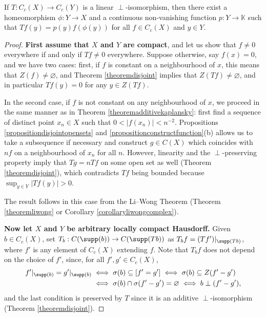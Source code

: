 
\begin{theorem}\label{theoremjarosz}
If $T:C_c(X)\to C_c(Y)$ is a linear $\perp$-isomorphism, then there exist a homeomorphism $\phi:Y\to X$ and a continuous non-vanishing function $p:Y\to\mathbb{K}$ such that $Tf(y)=p(y)f(\phi(y))$ for all $f\in C_c(X)$ and $y\in Y$.
\end{theorem}
\begin{proof}
\textbf{First assume that $X$ and $Y$ are compact}, and let us show that $f\neq 0$ everywhere if and only if $Tf\neq 0$ everywhere. Suppose otherwise, say $f(x)=0$, and we have two cases: first, if $f$ is constant on a neighbourhood of $x$, this means that $Z(f)\neq \varnothing$, and Theorem \ref{theoremdisjoint} implies that $Z(Tf)\neq \varnothing$, and in particular $Tf(y)=0$ for any $y\in Z(Tf)$.

In the second case, if $f$ is not constant on any neighbourhood of $x$, we proceed in the same manner as in Theorem \ref{theoremadditivekaplansky}: first find a sequence of distinct point $x_n\in X$ such that $0<|f(x_n)|<n^{-2}$. Propositions \ref{propositiondisjointopensets} and \ref{propositionconstructfunction}(b) allows us to take a subsequence if necessary and construct $g\in C(X)$ which coincides with $nf$ on a neighbourhood of $x_n$ for all $n$. However, linearity and the $\perp$-preserving property imply that $Tg=nTf$ on some open set as well (Theorem \ref{theoremdisjoint}), which contradicts $Tf$ being bounded because $\sup_{y\in Y}|Tf(y)|>0$.%

The result follows in this case from the Li--Wong Theorem (Theorem \ref{theoremliwong} or Corollary \ref{corollaryliwongcomplex}).

\textbf{Now let $X$ and $Y$ be arbitrary locally compact Hausdorff.} Given $b\in C_c(X)$, set $T_b:C(\supp(b))\to C(\supp(Tb))$ as $T_bf=(Tf')|_{\supp(Tb)}$, where $f'$ is any element of $C_c(X)$ extending $f$. Note that $T_bf$ does not depend on the choice of $f'$, since, for all $f',g'\in C_c(X)$,
\begin{align*}
f'|_{\supp(b)}=g'|_{\supp(b)}&\iff\sigma(b)\subseteq [f'=g']\iff\sigma(b)\subseteq Z(f'-g')\\
&\iff\sigma(b)\cap\sigma(f'-g')=\varnothing\iff b\perp(f'-g'),
\end{align*}
and the last condition is preserved by $T$ since it is an additive $\perp$-isomorphism (Theorem \ref{theoremdisjoint}).


\end{proof}
